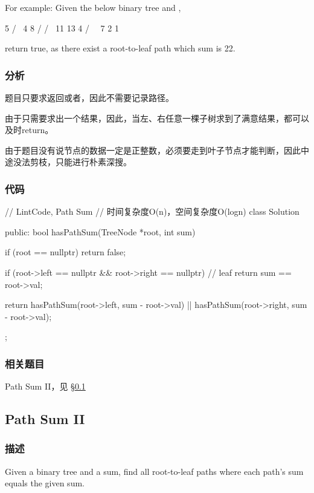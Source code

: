 For example:
Given the below binary tree and ,
\begin{Code}
          5
         / \
        4   8
       /   / \
      11  13  4
     /  \      \
    7    2      1
\end{Code}
return true, as there exist a root-to-leaf path  which sum is 22.


\subsubsection{分析}
题目只要求返回或者，因此不需要记录路径。

由于只需要求出一个结果，因此，当左、右任意一棵子树求到了满意结果，都可以及时return。

由于题目没有说节点的数据一定是正整数，必须要走到叶子节点才能判断，因此中途没法剪枝，只能进行朴素深搜。

\subsubsection{代码}

\begin{Code}
// LintCode, Path Sum
// 时间复杂度O(n)，空间复杂度O(logn)
class Solution {
public:
    bool hasPathSum(TreeNode *root, int sum) {
        if (root == nullptr) return false;

        if (root->left == nullptr && root->right == nullptr) // leaf
            return sum == root->val;

        return hasPathSum(root->left, sum - root->val)
                || hasPathSum(root->right, sum - root->val);
    }
};
\end{Code}


\subsubsection{相关题目}
\begindot
\item Path Sum II，见 \S \ref{sec:path-sum-ii}
\myenddot


\subsection{Path Sum II}
\label{sec:path-sum-ii}


\subsubsection{描述}
Given a binary tree and a sum, find all root-to-leaf paths where each path's sum equals the given sum.

